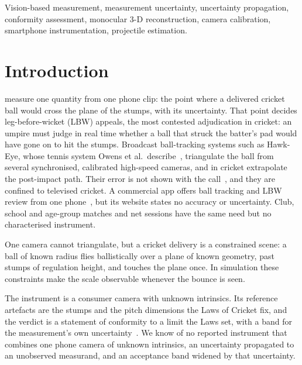 \documentclass[journal]{IEEEtran}
\begin{document}
\begin{IEEEkeywords}
Vision-based measurement, measurement uncertainty, uncertainty propagation, conformity assessment,
monocular 3-D reconstruction, camera calibration, smartphone instrumentation, projectile estimation.
\end{IEEEkeywords}

\section{Introduction}

 measure one quantity from one phone clip: the point where a delivered cricket
ball would cross the plane of the stumps, with its uncertainty. That point decides leg-before-wicket (LBW) appeals,
the most contested adjudication in cricket: an umpire must
judge in real time whether a ball that struck the batter's pad would have gone on to hit the stumps.
Broadcast ball-tracking systems such as Hawk-Eye, whose tennis system Owens et al.\ describe~\cite{owens2003hawkeye},
triangulate the ball from several synchronised, calibrated high-speed cameras, and in cricket extrapolate the post-impact path.
Their error is not shown with the call~\cite{collins2008hawkeye}, and they are confined to televised
cricket. A commercial app offers ball tracking and LBW review
from one phone~\cite{fulltrack2026}, but its website states no accuracy or uncertainty. Club, school and
age-group matches and net sessions have the same need but no characterised instrument.

One camera cannot triangulate, but a cricket delivery is a constrained scene: a ball of known radius flies
ballistically over a plane of known geometry, past stumps of regulation height, and touches the plane once.
In simulation these constraints make the scale observable whenever the bounce is seen.

The instrument is a consumer camera with unknown intrinsics. Its reference artefacts are the stumps and
the pitch dimensions the Laws of Cricket fix, and the verdict is a statement of conformity to a limit the Laws
set, with a band for the measurement's own uncertainty~\cite{carullo2024conformity}. We know
of no reported instrument that combines one phone camera of unknown intrinsics, an uncertainty propagated
to an unobserved measurand, and an acceptance band widened by that uncertainty.
\end{document}
